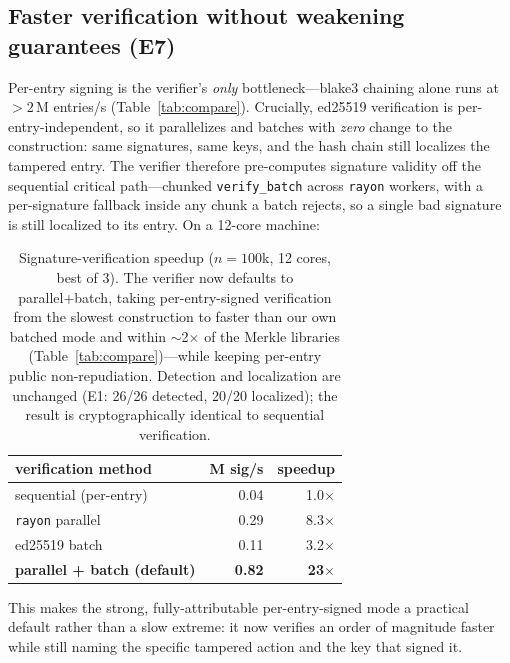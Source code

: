 \documentclass[11pt]{article}
\begin{document}
\subsection{Faster verification without weakening guarantees (E7)}\label{sec:fastverify}
Per-entry signing is the verifier's \emph{only} bottleneck---blake3 chaining alone runs at $>2$\,M
entries/s (Table~\ref{tab:compare}). Crucially, ed25519 verification is per-entry-independent, so it
parallelizes and batches with \emph{zero} change to the construction: same signatures, same keys, and the
hash chain still localizes the tampered entry. The verifier therefore pre-computes signature validity off
the sequential critical path---chunked \texttt{verify\_batch} across \texttt{rayon} workers, with a
per-signature fallback inside any chunk a batch rejects, so a single bad signature is still localized to
its entry. On a 12-core machine:

\begin{table}[htb]\centering\small
\begin{tabular}{lrr}
\toprule
verification method & M sig/s & speedup\\
\midrule
sequential (per-entry) & 0.04 & 1.0$\times$\\
\texttt{rayon} parallel & 0.29 & 8.3$\times$\\
ed25519 batch & 0.11 & 3.2$\times$\\
\textbf{parallel + batch (default)} & \textbf{0.82} & \textbf{23$\times$}\\
\bottomrule
\end{tabular}
\caption{Signature-verification speedup ($n{=}100$k, 12 cores, best of 3). The verifier now defaults to
parallel+batch, taking per-entry-signed verification from the slowest construction to faster than our own
batched mode and within $\sim$2$\times$ of the Merkle libraries (Table~\ref{tab:compare})---while keeping
per-entry public non-repudiation. Detection and localization are unchanged (E1: 26/26 detected, 20/20
localized); the result is cryptographically identical to sequential verification.}
\label{tab:fastverify}
\end{table}

This makes the strong, fully-attributable per-entry-signed mode a practical default rather than a slow
extreme: it now verifies an order of magnitude faster while still naming the specific tampered action and
the key that signed it.

\end{document}
